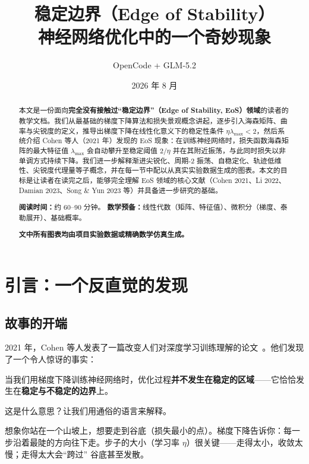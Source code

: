 \documentclass[11pt,a4paper]{ctexart}
\title{\textbf{\Huge 稳定边界（Edge of Stability）\\[0.3em]
\Large 神经网络优化中的一个奇妙现象}}
\author{OpenCode + GLM-5.2}
\date{2026 年 8 月}
\newcommand{\lmax}{\lambda_{\max}}
\begin{document}
\maketitle
\thispagestyle{empty}

\begin{abstract}
\noindent
本文是一份面向\textbf{完全没有接触过``稳定边界''（Edge of Stability, EoS）领域}的读者的教学文档。我们从最基础的梯度下降算法和损失景观概念讲起，逐步引入海森矩阵、曲率与尖锐度的定义，推导出梯度下降在线性化意义下的稳定性条件 $\eta\lmax < 2$，然后系统介绍 Cohen 等人（2021 年）发现的 EoS 现象：在训练神经网络时，损失函数海森矩阵的最大特征值 $\lmax$ 会自动攀升至稳定阈值 $2/\eta$ 并在其附近振荡，与此同时损失以非单调方式持续下降。我们进一步解释渐进尖锐化、周期-2 振荡、自稳定化、轨迹低维性、尖锐度代理量等子概念，并在每一节中配以从真实实验数据生成的图表。本文的目标是让读者在读完之后，能够完全理解 EoS 领域的核心文献（Cohen 2021、Li 2022、Damian 2023、Song \& Yun 2023 等）并具备进一步研究的基础。

\vspace{0.8em}
\noindent\textbf{阅读时间：}约 60--90 分钟。\quad
\textbf{数学预备：}线性代数（矩阵、特征值）、微积分（梯度、泰勒展开）、基础概率。

\vspace{0.5em}
\noindent\textbf{文中所有图表均由项目实验数据或精确数学仿真生成。}
\end{abstract}

\tableofcontents
\newpage

\section{引言：一个反直觉的发现}\label{sec:intro}

\subsection{故事的开端}

2021 年，Cohen 等人发表了一篇改变人们对深度学习训练理解的论文~\cite{cohen2021eos}。他们发现了一个令人惊讶的事实：

\begin{keybox}
当我们用梯度下降训练神经网络时，优化过程\textbf{并不发生在稳定的区域}——它恰恰发生在\textbf{稳定与不稳定的边界}上。
\end{keybox}

这是什么意思？让我们用通俗的语言来解释。

想象你站在一个山坡上，想要走到谷底（损失最小的点）。梯度下降告诉你：每一步沿着最陡的方向往下走。步子的大小（学习率 $\eta$）很关键——走得太小，收敛太慢；走得太大会``跨过'' 谷底甚至发散。
\end{document}
